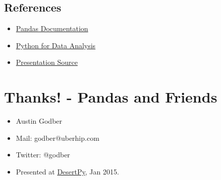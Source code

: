 \documentclass{article}
\begin{document}
    \subsection{References}\label{references}

\begin{itemize}
\itemsep1pt\parskip0pt
\item
  \href{http://pandas.pydata.org/pandas-docs/stable/index.html}{Pandas
  Documentation}
\item
  \href{http://www.amazon.com/Python-Data-Analysis-Wes-McKinney/dp/1449319793/}{Python
  for Data Analysis}
\item
  \href{https://github.com/desertpy/presentations}{Presentation Source}
\end{itemize}

    \section{Thanks! - Pandas and
Friends}\label{thanks---pandas-and-friends}

\begin{itemize}
\itemsep1pt\parskip0pt
\item
  Austin Godber
\item
  Mail: godber@uberhip.com
\item
  Twitter: @godber
\item
  Presented at \href{http://desertpy.com}{DesertPy}, Jan 2015.
\end{itemize}


    
    
    
    
\end{document}
